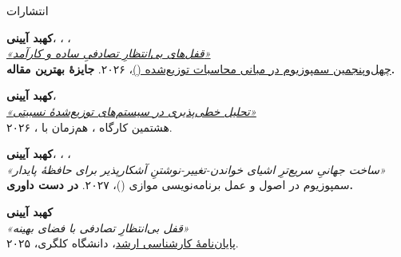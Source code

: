\documentclass[11pt]{article}
\begin{document}
\begin{faSection}{انتشارات}

\textbf{کهبد آیینی}، ، ، \\
\href{https://dl.acm.org/doi/10.1145/3796701.3815952}{\textit{«قفل‌های بی‌انتظارِ تصادفیِ ساده و کارآمد»}}\\
\href{https://www.podc.org/podc2026/}{چهل‌وپنجمین سمپوزیوم  در مبانی محاسبات توزیع‌شده ()}، ۲۰۲۶. \textbf{جایزۀ بهترین مقاله.}

\vspace{0.5em}
\textbf{کهبد آیینی}، \\
\href{https://dl.acm.org/doi/10.1145/3820355.3820388}{\textit{«تحلیل خطی‌پذیری در سیستم‌های توزیع‌شدۀ نسبیتی»}}\\
هشتمین کارگاه ، هم‌زمان با ، ۲۰۲۶.

\vspace{0.5em}
\textbf{کهبد آیینی}، ، ، \\
\textit{«ساخت جهانیِ سریع‌ترِ اشیای خواندن-تغییر-نوشتنِ آشکارپذیر برای حافظۀ پایدار»}\\
سمپوزیوم  در اصول و عمل برنامه‌نویسی موازی ()، ۲۰۲۷. \textbf{در دست داوری.}

\vspace{0.5em}
\textbf{کهبد آیینی}\\
\textit{«قفل بی‌انتظارِ تصادفی با فضای بهینه»}\\
\href{https://ucalgary.scholaris.ca/bitstreams/5ae5cf8f-5009-4db3-b91e-d3dbb679b5bf/download}{پایان‌نامۀ کارشناسی ارشد}، دانشگاه کلگری، ۲۰۲۵.

\end{faSection}
\end{document}
